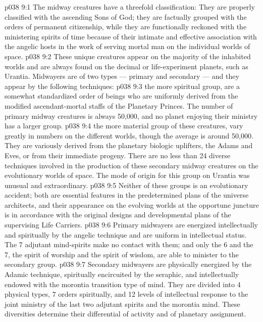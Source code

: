 \vs p038 9:1 The midway creatures have a threefold classification: They are properly classified with the ascending Sons of God; they are factually grouped with the orders of permanent citizenship, while they are functionally reckoned with the ministering spirits of time because of their intimate and effective association with the angelic hosts in the work of serving mortal man on the individual worlds of space.
\vs p038 9:2 These unique creatures appear on the majority of the inhabited worlds and are always found on the decimal or life\hyp{}experiment planets, such as Urantia. Midwayers are of two types --- primary and secondary --- and they appear by the following techniques:
\vs p038 9:3 \bibnobreakspace {} the more spiritual group, are a somewhat standardized order of beings who are uniformly derived from the modified ascendant\hyp{}mortal staffs of the Planetary Princes. The number of primary midway creatures is always 50,000, and no planet enjoying their ministry has a larger group.
\vs p038 9:4 \bibnobreakspace {} the more material group of these creatures, vary greatly in numbers on the different worlds, though the average is around 50,000. They are variously derived from the planetary biologic uplifters, the Adams and Eves, or from their immediate progeny. There are no less than 24 diverse techniques involved in the production of these secondary midway creatures on the evolutionary worlds of space. The mode of origin for this group on Urantia was unusual and extraordinary.
\vs p038 9:5 \pc Neither of these groups is an evolutionary accident; both are essential features in the predetermined plans of the universe architects, and their appearance on the evolving worlds at the opportune juncture is in accordance with the original designs and developmental plans of the supervising Life Carriers.
\vs p038 9:6 Primary midwayers are energized intellectually and spiritually by the angelic technique and are uniform in intellectual status. The 7 adjutant mind\hyp{}spirits make no contact with them; and only the 6 and the 7, the spirit of worship and the spirit of wisdom, are able to minister to the secondary group.
\vs p038 9:7 Secondary midwayers are physically energized by the Adamic technique, spiritually encircuited by the seraphic, and intellectually endowed with the morontia transition type of mind. They are divided into 4 physical types, 7 orders spiritually, and 12 levels of intellectual response to the joint ministry of the last two adjutant spirits and the morontia mind. These diversities determine their differential of activity and of planetary assignment.
